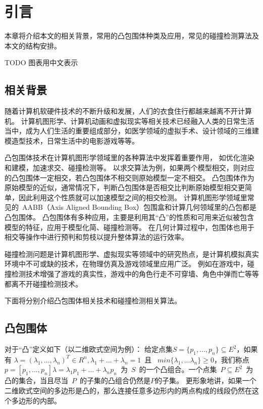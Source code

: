 

\chapter{引言}
\label{cha:intro}

本章将介绍本文的相关背景，常用的凸包围体种类及应用，常见的碰撞检测算法及本文的结构安排。


TODO 图表用中文表示


\section{相关背景}

随着计算机软硬件技术的不断升级和发展，人们的衣食住行都越来越离不开计算机。
计算机图形学、计算机动画和虚拟现实等相关技术已经融入人类的日常生活当中，成为人们生活的重要组成部分，如医学领域的虚拟手术、设计领域的三维建模造型技术，日常生活中的电影游戏等等。

凸包围体技术在计算机图形学领域里的各种算法中发挥着重要作用，
如优化渲染和建模，加速求交、碰撞检测等。
以求交算法为例，如果两个模型相交，则对应的凸包围体一定相交，若凸包围体不相交则原始模型一定不相交。
凸包围体作为原始模型的近似，通常情况下，判断凸包围体是否相交比判断原始模型相交更简单，因此利用这个性质就可以加速模型之间的相交检测。
计算机图形学领域里常见的~AABB（Axis Aligned Bounding Box）包围盒和计算几何领域里的凸包都是凸包围体。
凸包围体有多种应用，主要是利用其“凸”的性质和可用来近似被包含模型的特征，应用于模型化简、碰撞检测等。
在几何计算过程中，包围体也用于相交等操作中进行预判和剪枝以提升整体算法的运行效率。

碰撞检测问题是计算机图形学、虚拟现实等领域中的研究热点，是计算机模拟真实环境中不可或缺的技术，在物理仿真及游戏领域里应用广泛。
例如在游戏中，碰撞检测技术增强了游戏的真实性，游戏中的角色行走不可穿墙、角色中弹而亡等等都离不开碰撞检测技术。

下面将分别介绍凸包围体相关技术和碰撞检测相关算法。

\section{凸包围体}
\label{sec:convex-bv}

对于“凸”定义如下（以二维欧式空间为例）：
给定点集$S = \{p_1, ..., p_n\} \subseteq E^2$，如果有
$\lambda = (\lambda_1,...,\lambda_n)^T \in R^n, \lambda_1 + ... + \lambda_n = 1
$~且~ $min\{\lambda_1,...\lambda_n\} \geq 0$，我们称点 $p = [p_1, ... ,
p_n]\lambda = \lambda_1 p_1 + ... + \lambda_n
p_n$~为~$S$~的一个凸组合。一个点集~$P \subseteq E^2$~为凸的集合，当且尽当~$P$~的子集的凸组合仍然是$P$的子集。
更形象地讲，如果一个二维欧式空间的多边形是凸的，那么连接任意多边形内的两点构成的线段仍然在这个多边形的内部。

